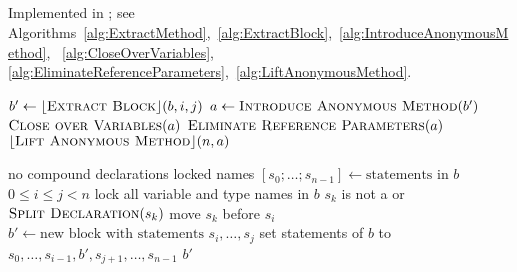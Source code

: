 \subsection{}
Implemented in ; 
see Algorithms~\ref{alg:ExtractMethod},~\ref{alg:ExtractBlock},~\ref{alg:IntroduceAnonymousMethod},~%
\ref{alg:CloseOverVariables},~%
\ref{alg:EliminateReferenceParameters},~\ref{alg:LiftAnonymousMethod}.

\begin{algorithm}[p]
\caption{$\refactoring{Extract Method}(b \colon \type{Block}, i \colon \type{nat}, j \colon \type{nat}, n \colon \type{ident}) \colon \type{Method}$}
\label{alg:ExtractMethod}
\begin{algorithmic}[1]
\REQUIRE
\ENSURE
\medskip
\STATE $b' \leftarrow \lfloor\textsc{Extract Block}\rfloor(b, i, j)$
\STATE $a \leftarrow \textsc{Introduce Anonymous Method}(b')$
\STATE $\textsc{Close over Variables}(a)$
\STATE $\textsc{Eliminate Reference Parameters}(a)$
\RETURN $\lfloor\textsc{Lift Anonymous Method}\rfloor(n, a)$
\end{algorithmic}
\end{algorithm}


\begin{algorithm}[p]
\caption{$\refactoring{Extract Block}(b \colon \type{Block}, i \colon \type{nat}, j \colon \type{nat}) \colon \type{Block}$}
\label{alg:ExtractBlock}
\begin{algorithmic}[1]
\REQUIRE no compound declarations
\ENSURE locked names
\medskip
\STATE $[s_0;\ldots;s_{n-1}] \leftarrow \text{statements in $b$}$
\STATE \assert $0\leq i\leq j<n$
\STATE lock all variable and type names in $b$
  \STATE \assert $s_k$ is not a  or 
    \STATE $\textsc{Split Declaration}(s_k)$
    \STATE move $s_k$ before $s_i$
  \ENDIF
\ENDFOR
\STATE $b' \leftarrow \text{new block with statements $s_i,\ldots,s_j$}$
\STATE set statements of $b$ to $s_0,\ldots,s_{i-1},b',s_{j+1},\ldots,s_{n-1}$
\RETURN $b'$
\end{algorithmic}
\end{algorithm}

